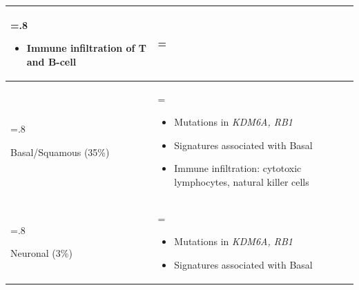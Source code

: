 \begin{table}[htbp]
\begin{tabularx}{\textwidth}{>{\hsize=.8\hsize\raggedright\arraybackslash}X >{\hsize=\hsize\arraybackslash}X}
\begin{itemize}[leftmargin=*, nosep, after=\vspace{-\baselineskip}]
        \item Immune infiltration of T and B-cell
    \end{itemize} \\
    \midrule
    Basal/Squamous (35\%) & 
    \begin{itemize}[leftmargin=*, nosep, after=\vspace{-\baselineskip}]
        \item Mutations in \textit{KDM6A, RB1}
        \item Signatures associated with Basal
        \item Immune infiltration: cytotoxic lymphocytes, natural killer cells
    \end{itemize} \\
    \midrule
    Neuronal (3\%) & 
    \begin{itemize}[leftmargin=*, nosep, after=\vspace{-\baselineskip}]
        \item Mutations in \textit{KDM6A, RB1}
        \item Signatures associated with Basal
    \end{itemize} \\
    \bottomrule
    \end{tabularx}
    \label{tab:lit:consensus_genes}
\end{table}

